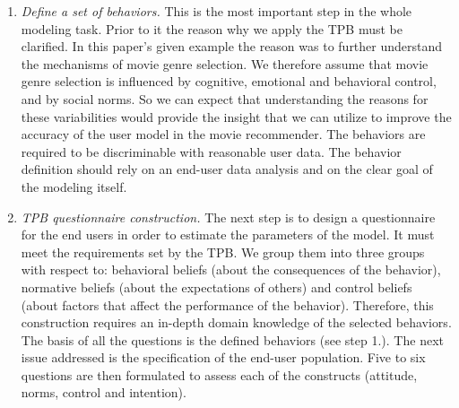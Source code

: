 \documentclass{llncs}
\begin{document}
\begin{enumerate}
 \item {\it Define a set of behaviors.} This is the most important step in the whole modeling task. Prior to it the reason why we apply the TPB must be clarified. In this paper’s given example the reason was to further understand the mechanisms of movie genre selection. We therefore assume that movie genre selection is influenced by cognitive, emotional and behavioral control, and by social norms. %
So we can expect that understanding the reasons for these variabilities would provide the insight that we can utilize to improve the accuracy of the user model in the movie recommender. 
The behaviors are required to be discriminable with reasonable user data. 
The behavior definition should rely on an end-user data analysis and on the clear goal of the modeling itself.   
 \item {\it TPB questionnaire construction.} The next step is to design a questionnaire for the end users in order to estimate the parameters of the model. It must meet the requirements set by the TPB. We group them into three groups with respect to: behavioral beliefs (about the consequences of the behavior), normative beliefs (about the expectations of others) and control beliefs (about factors that affect the performance of the behavior). Therefore, this construction requires an in-depth domain knowledge of the selected behaviors. The basis of all the questions is the defined behaviors (see step 1.). The next issue addressed is the specification of the end-user population. Five to six questions are then formulated to assess each of the constructs (attitude, norms, control and intention). 

\end{enumerate}
\end{document}
